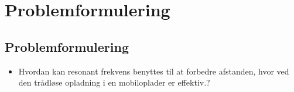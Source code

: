 \chapter{Problemformulering}

\section{Problemformulering}
\begin{itemize}

\item Hvordan kan resonant frekvens benyttes til at forbedre afstanden, hvor ved den trådløse opladning i en mobiloplader er effektiv.?

\end{itemize}
